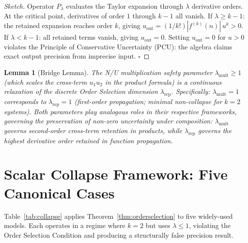 \documentclass[11pt]{article}
\newtheorem{lemma}[theorem]{Lemma}
\theoremstyle{definition}
\begin{document}
\begin{proof}[Sketch]
Operator $P_\lambda$ evaluates the Taylor expansion through $\lambda$ derivative
orders.  At the critical point, derivatives of order $1$ through $k-1$ all vanish.
If $\lambda \ge k-1$: the retained expansion reaches order $k$, giving
$u_{\mathrm{out}} = (1/k!)|f^{(k)}(n)|\,u^k > 0$.
If $\lambda < k-1$: all retained terms vanish, giving $u_{\mathrm{out}} = 0$.
Setting $u_{\mathrm{out}} = 0$ for $u > 0$ violates the Principle of Conservative
Uncertainty (PCU): the algebra claims exact output precision from imprecise input.
$\square$
\end{proof}

\begin{lemma}[Bridge Lemma]
\label{lem:bridge}
The N/U multiplication safety parameter $\lambda_{\mathrm{mult}} \ge 1$
(which scales the cross-term $u_1 u_2$ in the product formula) is a continuous
relaxation of the discrete Order Selection dimension $\lambda_{\mathrm{rep}}$.
Specifically: $\lambda_{\mathrm{mult}} = 1$ corresponds to $\lambda_{\mathrm{rep}} = 1$
(first-order propagation; minimal non-collapse for $k=2$ systems).
Both parameters play analogous roles in their respective frameworks, governing
the preservation of non-zero uncertainty under composition:
$\lambda_{\mathrm{mult}}$ governs second-order cross-term retention in products,
while $\lambda_{\mathrm{rep}}$ governs the highest derivative order retained
in function propagation.
\end{lemma}

\section{Scalar Collapse Framework: Five Canonical Cases}
\label{sec:collapse}

Table~\ref{tab:collapse} applies Theorem~\ref{thm:orderselection} to five
widely-used models.
Each operates in a regime where $k=2$ but uses $\lambda \le 1$, violating the
Order Selection Condition and producing a structurally false precision result.
\end{document}

